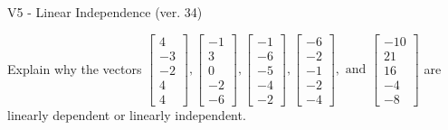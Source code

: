 \begin{exercise}
  \begin{exerciseTitle}V5 - Linear Independence (ver. 34)\end{exerciseTitle}
  \begin{exerciseStatement}
    Explain why the vectors \(\left[\begin{array}{r}
4 \\
-3 \\
-2 \\
4 \\
4
\end{array}\right] , \left[\begin{array}{r}
-1 \\
3 \\
0 \\
-2 \\
-6
\end{array}\right] , \left[\begin{array}{r}
-1 \\
-6 \\
-5 \\
-4 \\
-2
\end{array}\right] , \left[\begin{array}{r}
-6 \\
-2 \\
-1 \\
-2 \\
-4
\end{array}\right] , \text{ and } \left[\begin{array}{r}
-10 \\
21 \\
16 \\
-4 \\
-8
\end{array}\right]\) are linearly dependent or linearly independent.	



\end{exerciseStatement}
\end{exercise}
